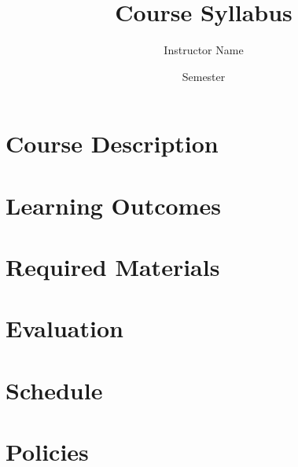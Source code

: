 \documentclass[12pt]{article}
\begin{document}
\title{Course Syllabus}
\author{Instructor Name}
\date{Semester}
\maketitle

\section*{Course Description}

\section*{Learning Outcomes}

\section*{Required Materials}

\section*{Evaluation}

\section*{Schedule}

\section*{Policies}
\end{document}

